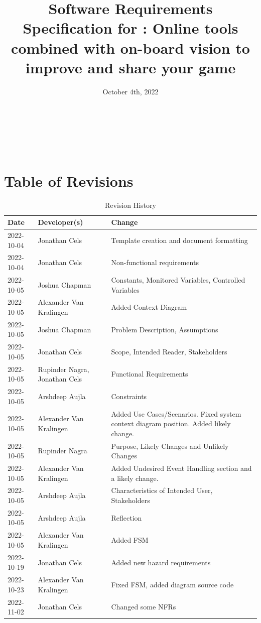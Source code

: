 \documentclass[12pt]{article}
\begin{document}
\title{Software Requirements Specification for \progname{}: Online tools combined with on-board vision to improve and share your game} 
\author{\authname}
\date{October 4th, 2022}
	
\maketitle

~\newpage

\tableofcontents

~\newpage

\section*{Table of Revisions}
\begin{table}[hp]
\caption{Revision History} \label{TblRevisionHistory}
\begin{tabularx}{\textwidth}{llX}
\toprule
\textbf{Date} & \textbf{Developer(s)} & \textbf{Change}\\
\midrule
2022-10-04 & Jonathan Cels & Template creation and document formatting\\ 
2022-10-04 & Jonathan Cels & Non-functional requirements\\
2022-10-05 & Joshua Chapman & Constants, Monitored Variables, Controlled Variables\\
2022-10-05 & Alexander Van Kralingen & Added Context Diagram\\
2022-10-05 & Joshua Chapman & Problem Description, Assumptions \\
2022-10-05 & Jonathan Cels & Scope, Intended Reader, Stakeholders\\
2022-10-05 & Rupinder Nagra, Jonathan Cels & Functional Requirements\\
2022-10-05 & Arshdeep Aujla & Constraints\\
2022-10-05 & Alexander Van Kralingen & Added Use Cases/Scenarios. Fixed system context diagram position. Added likely change.\\
2022-10-05 & Rupinder Nagra & Purpose, Likely Changes and Unlikely Changes\\
2022-10-05 & Alexander Van Kralingen & Added Undesired Event Handling section and a likely change.\\
2022-10-05 & Arshdeep Aujla & Characteristics of Intended User, Stakeholders\\
2022-10-05 & Arshdeep Aujla & Reflection\\
2022-10-05 & Alexander Van Kralingen & Added FSM\\
2022-10-19 & Jonathan Cels & Added new hazard requirements\\
2022-10-23 & Alexander Van Kralingen & Fixed FSM, added diagram source code\\
2022-11-02 & Jonathan Cels & Changed some NFRs\\
\bottomrule
\end{tabularx}
\end{table}
\end{document}
